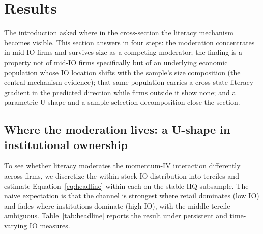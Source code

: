 \section{Results}
\label{sec:results}

The introduction asked where in the cross-section the literacy mechanism becomes visible. This section answers in four steps: the moderation concentrates in mid-IO firms and survives size as a competing moderator; the finding is a property not of mid-IO firms specifically but of an underlying economic population whose IO location shifts with the sample's size composition (the central mechanism evidence); that same population carries a cross-state literacy gradient in the predicted direction while firms outside it show none; and a parametric U-shape and a sample-selection decomposition close the section.

\subsection{Where the moderation lives: a U-shape in institutional ownership}
\label{sec:headline}

To see whether literacy moderates the momentum-IV interaction differently across firms, we discretize the within-stock IO distribution into terciles and estimate Equation~\eqref{eq:headline} within each on the stable-HQ subsample. The naive expectation is that the channel is strongest where retail dominates (low IO) and fades where institutions dominate (high IO), with the middle tercile ambiguous. Table~\ref{tab:headline} reports the result under persistent and time-varying IO measures.


